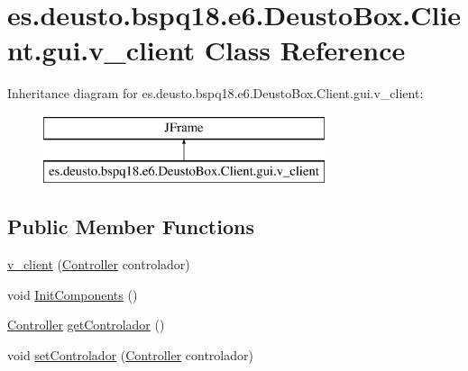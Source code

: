 \hypertarget{classes_1_1deusto_1_1bspq18_1_1e6_1_1_deusto_box_1_1_client_1_1gui_1_1v__client}{}\section{es.\+deusto.\+bspq18.\+e6.\+Deusto\+Box.\+Client.\+gui.\+v\+\_\+client Class Reference}
\label{classes_1_1deusto_1_1bspq18_1_1e6_1_1_deusto_box_1_1_client_1_1gui_1_1v__client}
Inheritance diagram for es.\+deusto.\+bspq18.\+e6.\+Deusto\+Box.\+Client.\+gui.\+v\+\_\+client\+:\begin{figure}[H]
\begin{center}
\leavevmode
\includegraphics[height=2.000000cm]{classes_1_1deusto_1_1bspq18_1_1e6_1_1_deusto_box_1_1_client_1_1gui_1_1v__client}
\end{center}
\end{figure}
\subsection*{Public Member Functions}
\begin{DoxyCompactItemize}
\item 
\mbox{\hyperlink{classes_1_1deusto_1_1bspq18_1_1e6_1_1_deusto_box_1_1_client_1_1gui_1_1v__client_a2c099b3d36e4aee57de44ad1c2376593}{v\+\_\+client}} (\mbox{\hyperlink{classes_1_1deusto_1_1bspq18_1_1e6_1_1_deusto_box_1_1_client_1_1controller_1_1_controller}{Controller}} controlador)
\item 
void \mbox{\hyperlink{classes_1_1deusto_1_1bspq18_1_1e6_1_1_deusto_box_1_1_client_1_1gui_1_1v__client_afd44c1513d98bea0517890f9b670bf3a}{Init\+Components}} ()
\item 
\mbox{\hyperlink{classes_1_1deusto_1_1bspq18_1_1e6_1_1_deusto_box_1_1_client_1_1controller_1_1_controller}{Controller}} \mbox{\hyperlink{classes_1_1deusto_1_1bspq18_1_1e6_1_1_deusto_box_1_1_client_1_1gui_1_1v__client_a4c293642331bf278894b6f3171b789f3}{get\+Controlador}} ()
\item 
void \mbox{\hyperlink{classes_1_1deusto_1_1bspq18_1_1e6_1_1_deusto_box_1_1_client_1_1gui_1_1v__client_a69adfd37086caaf424539c59182786a0}{set\+Controlador}} (\mbox{\hyperlink{classes_1_1deusto_1_1bspq18_1_1e6_1_1_deusto_box_1_1_client_1_1controller_1_1_controller}{Controller}} controlador)
\end{DoxyCompactItemize}


